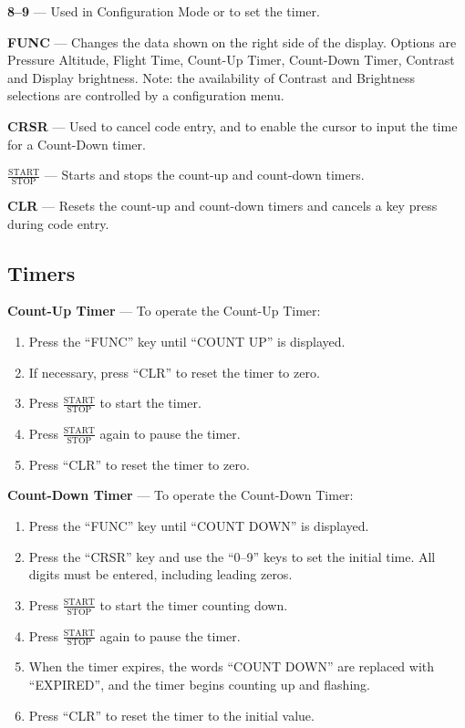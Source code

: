 \textbf{8--9} --- Used in Configuration Mode or to set the timer.

\textbf{FUNC} --- Changes the data shown on the right side of the display. Options are Pressure Altitude, Flight Time, Count-Up Timer, Count-Down Timer, Contrast and Display brightness. Note: the availability of Contrast and Brightness selections are controlled by a configuration menu.

\textbf{CRSR} --- Used to cancel code entry, and to enable the cursor to input the time for a Count-Down timer.

\textbf{$\mathrm{\frac{START}{STOP}}$} --- Starts and stops the count-up and count-down timers.

\textbf{CLR} --- Resets the count-up and count-down timers and cancels a key press during code entry.

\subsection*{Timers}

\textbf{Count-Up Timer} --- To operate the Count-Up Timer: 
\begin{enumerate}
\item Press the ``FUNC'' key until ``COUNT UP'' is displayed. 
\item If necessary, press ``CLR'' to reset the timer to zero. 
\item Press $\mathrm{\frac{START}{STOP}}$ to start the timer. 
\item Press $\mathrm{\frac{START}{STOP}}$ again to pause the timer. 
\item Press ``CLR'' to reset the timer to zero. 
\end{enumerate}

\textbf{Count-Down Timer} --- To operate the Count-Down Timer: 
\begin{enumerate}
\item Press the ``FUNC'' key until ``COUNT DOWN'' is displayed. 
\item Press the ``CRSR'' key and use the ``0--9'' keys to set the initial time. All digits must be entered, including leading zeros. 
\item Press $\mathrm{\frac{START}{STOP}}$ to start the timer counting down. 
\item Press $\mathrm{\frac{START}{STOP}}$ again to pause the timer. 
\item When the timer expires, the words ``COUNT DOWN'' are replaced with ``EXPIRED'', and the timer begins counting up and flashing. 
\item Press ``CLR'' to reset the timer to the initial value. 
\end{enumerate}

